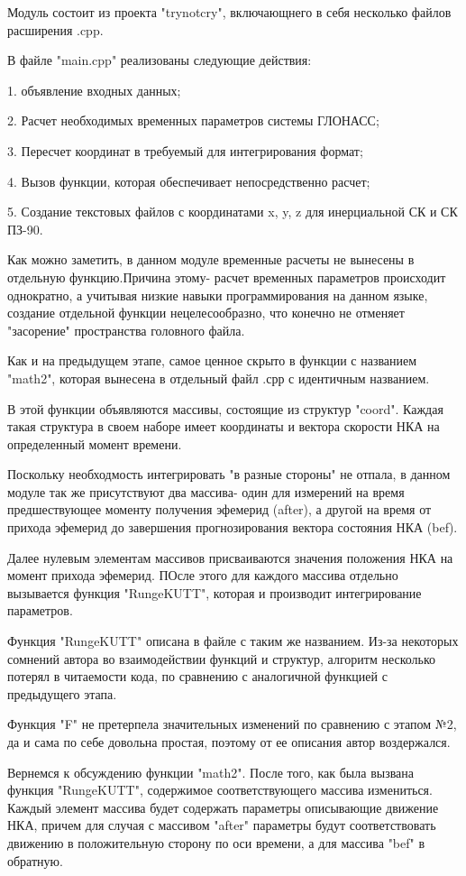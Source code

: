 \documentclass[]{article}
\begin{document}
Модуль состоит из проекта "trynotcry", включающнего в себя несколько файлов расширения .cpp.

В файле "main.cpp" реализованы следующие действия:

1. объявление входных данных;

2. Расчет необходимых временных параметров системы ГЛОНАСС;

3. Пересчет координат в требуемый для интегрирования формат;

4. Вызов функции, которая обеспечивает непосредственно  расчет;

5. Создание текстовых файлов с координатами x, y, z для инерциальной СК и СК ПЗ-90.

Как  можно заметить, в данном модуле временные расчеты не вынесены в отдельную функцию.Причина этому- расчет временных параметров происходит однократно, а учитывая низкие навыки программирования на данном языке, создание отдельной функции нецелесообразно, что конечно не отменяет "засорение" пространства головного файла.

Как и на предыдущем этапе, самое ценное скрыто в функции с названием "math2", которая вынесена в отдельный файл .срр с идентичным названием. 

В этой функции объявляются массивы, состоящие из структур "coord". Каждая такая структура в своем наборе имеет координаты и вектора скорости НКА на определенный момент времени.

Поскольку необходмость интегрировать "в разные стороны" не отпала, в данном модуле так же присутствуют два массива- один для измерений на время предшествующее моменту получения эфемерид (after), а другой на время от прихода эфемерид до завершения прогнозирования вектора состояния НКА (bef).

Далее нулевым элементам массивов присваиваются значения положения НКА на момент прихода эфемерид. ПОсле этого для каждого массива отдельно вызывается функция "RungeKUTT", которая и производит интегрирование параметров.

Функция "RungeKUTT" описана в файле с таким же названием. 
Из-за некоторых сомнений автора во взаимодействии функций и структур, алгоритм несколько потерял в читаемости кода, по сравнению с аналогичной функцией с предыдущего этапа.

Функция "F" не претерпела значительных изменений по сравнению с этапом №2, да и сама по себе довольна простая, поэтому от ее описания автор воздержался.

Вернемся к обсуждению функции "math2". После того, как была вызвана функция "RungeKUTT", содержимое соответствующего массива измениться. Каждый элемент массива будет содержать параметры описывающие движение НКА, причем для случая с массивом "after" параметры будут соответствовать движению в положительную сторону по оси времени, а для массива "bef" в обратную.
\end{document}
